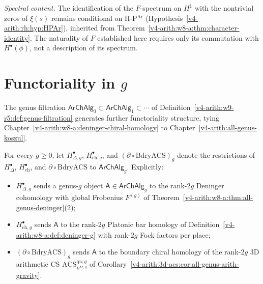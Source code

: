 \emph{Spectral content.} The identification of the \(F\)-spectrum on
\(H^{1}\) with the nontrivial zeros of \(\xi(s)\) remains conditional
on H-P\(^{\mathrm{Ar}}\) (Hypothesis~\ref{v4-arith:rh:hyp:HPAr}), inherited from
Theorem~\ref{v4-arith:w8-a:thm:character-identity}. The naturality of \(F\)
established here requires only its commutation with \(H^{\bullet}(\phi)\),
not a description of its spectrum.

\section{Functoriality in \(g\)}
\label{v4-arith:w9-r5:functoriality-g}

The genus filtration
\(\mathsf{ArChAlg}_{0}\subset\mathsf{ArChAlg}_{1}\subset\cdots\) of
Definition~\ref{v4-arith:w9-r5:def:genus-filtration} generates further
functoriality structure, tying Chapter~\ref{v4-arith:w8-a:deninger-chiral-homology}
to Chapter~\ref{v4-arith:all-genus-koszul}.

\begin{definition}
\label{v4-arith:w9-r5:def:genus-restricted}
For every \(g\geq 0\), let
\(H^{\bullet}_{\Delta,g}\), \(H^{\bullet}_{\mathrm{ch},g}\), and
\((\partial\circ\mathrm{BdryACS})_{g}\) denote the restrictions of
\(H^{\bullet}_{\Delta}\), \(H^{\bullet}_{\mathrm{ch}}\), and
\(\partial\circ\mathrm{BdryACS}\) to \(\mathsf{ArChAlg}_{g}\).
Explicitly:
\begin{itemize}
\item \(H^{\bullet}_{\Delta,g}\) sends a genus-\(g\) object
\(\mathsf{A}\in\mathsf{ArChAlg}_{g}\) to the rank-\(2g\) Deninger
cohomology with global Frobenius \(F^{(g)}\) of
Theorem~\ref{v4-arith:w8-a:thm:all-genus-deninger}(2);
\item \(H^{\bullet}_{\mathrm{ch},g}\) sends \(\mathsf{A}\) to the
rank-\(2g\) Platonic bar homology of
Definition~\ref{v4-arith:w8-a:def:deninger-g} with rank-\(2g\) Fock factors per
place;
\item \((\partial\circ\mathrm{BdryACS})_{g}\) sends \(\mathsf{A}\) to
the boundary chiral homology of the rank-\(2g\) 3D arithmetic CS
\(\mathrm{ACS}^{\mathrm{qu},g}_{k^{\mathrm{Ar},g}}\) of
Corollary~\ref{v4-arith:3d-acs:cor:all-genus-arith-gravity}.
\end{itemize}
\end{definition}

